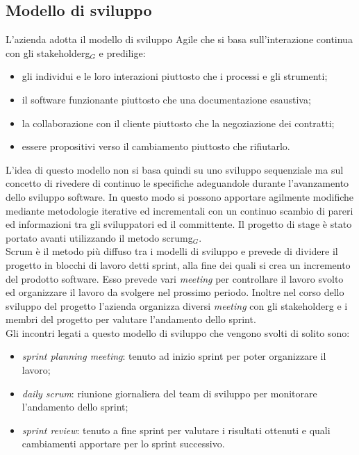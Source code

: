 \subsection{Modello di sviluppo}

L'azienda adotta il modello di sviluppo Agile che si basa sull'interazione continua con gli \gls{stakeholderg}$_G$ e predilige:
\begin{itemize}
	\item gli individui e le loro interazioni piuttosto che i processi e gli strumenti;
	\item il software funzionante piuttosto che una documentazione esaustiva;
	\item la collaborazione con il cliente piuttosto che la negoziazione dei contratti;
	\item essere propositivi verso il cambiamento piuttosto che rifiutarlo.
\end{itemize}
L'idea di questo modello non si basa quindi su uno sviluppo sequenziale ma sul concetto di rivedere di continuo le specifiche adeguandole durante l'avanzamento dello sviluppo software. In questo modo si possono apportare agilmente modifiche mediante metodologie iterative ed incrementali con un continuo scambio di pareri ed informazioni tra gli sviluppatori ed il committente. Il progetto di stage è stato portato avanti utilizzando il metodo \gls{scrumg}$_G$.\\
Scrum è il metodo più diffuso tra i modelli di sviluppo e prevede di dividere il progetto in blocchi di lavoro detti sprint, alla fine dei quali si crea un incremento del prodotto software. Esso prevede vari \textit{meeting} per controllare il lavoro svolto ed organizzare il lavoro da svolgere nel prossimo periodo. Inoltre nel corso dello sviluppo del progetto l'azienda organizza diversi \textit{meeting} con gli \gls{stakeholderg} e i membri del progetto per valutare l'andamento dello sprint.\\
Gli incontri legati a questo modello di sviluppo che vengono svolti di solito sono:
\begin{itemize}
	\item \textit{sprint planning meeting}: tenuto ad inizio sprint per poter organizzare il lavoro;
	\item \textit{daily scrum}: riunione giornaliera del team di sviluppo per monitorare l'andamento dello sprint;
	\item \textit{sprint review}: tenuto a fine sprint per valutare i risultati ottenuti e quali cambiamenti apportare per lo sprint successivo.
\end{itemize}
